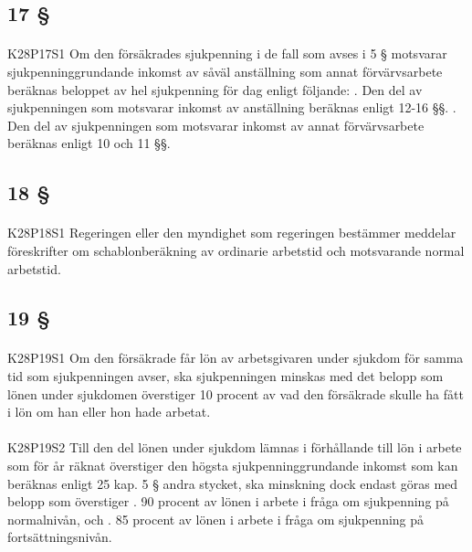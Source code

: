 \documentclass[a4paper,notitlepage,openany,10pt]{book}
\begin{document}
\subsection*{17 §}
\paragraph*{}
{\tiny K28P17S1}
Om den försäkrades sjukpenning i de fall som avses i 5 § motsvarar sjukpenninggrundande inkomst av såväl anställning som annat förvärvsarbete beräknas beloppet av hel sjukpenning för dag enligt följande:
. Den del av sjukpenningen som motsvarar inkomst av anställning beräknas enligt 12-16 §§.
. Den del av sjukpenningen som motsvarar inkomst av annat förvärvsarbete beräknas enligt 10 och 11 §§.
\subsection*{18 §}
\paragraph*{}
{\tiny K28P18S1}
Regeringen eller den myndighet som regeringen bestämmer meddelar föreskrifter om schablonberäkning av ordinarie arbetstid och motsvarande normal arbetstid.
\subsection*{19 §}
\paragraph*{}
{\tiny K28P19S1}
Om den försäkrade får lön av arbetsgivaren under sjukdom för samma tid som sjukpenningen avser, ska sjukpenningen minskas med det belopp som lönen under sjukdomen överstiger 10 procent av vad den försäkrade skulle ha fått i lön om han eller hon hade arbetat.
\paragraph*{}
{\tiny K28P19S2}
Till den del lönen under sjukdom lämnas i förhållande till lön i arbete som för år räknat överstiger den högsta sjukpenninggrundande inkomst som kan beräknas enligt 25 kap. 5 § andra stycket, ska minskning dock endast göras med belopp som överstiger
. 90 procent av lönen i arbete i fråga om sjukpenning på normalnivån, och
. 85 procent av lönen i arbete i fråga om sjukpenning på fortsättningsnivån.
\end{document}
